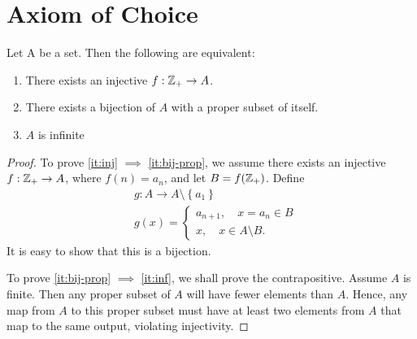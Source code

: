 \section{Axiom of Choice}
\begin{theorem}
	Let A be a set. Then the following are equivalent:
	\begin{enumerate}
		\item\label{it:inj} There exists an injective $f: \mathbb{Z}_{+} \to A$.
		\item\label{it:bij-prop} There exists a bijection of $A$ with a proper subset of itself.
		\item\label{it:inf} $A$ is infinite
	\end{enumerate}
\label{thm:inj-mapping}
\end{theorem}
\begin{proof}
	To prove \cref{it:inj} $\implies$ \cref{it:bij-prop}, we assume there exists an injective $f: \mathbb{Z}_{+} \to A$, where $f(n) =
	a_{n}$, and let $B = f(\mathbb{Z}_{+})$. Define
	\begin{equation*}
		\begin{split}
			& g: A \to A \setminus \left\{ a_{1} \right\} \\
			& g(x) = \begin{cases}
				a_{n+1}, \quad x = a_{n} \in B \\
				x, \quad x \in A \setminus B.
			\end{cases}
		\end{split}
	\end{equation*} It is easy to show that this is a bijection.

	To prove \cref{it:bij-prop} $\implies$ \cref{it:inf}, we shall prove the
	contrapositive. Assume $A$ is finite. Then any proper subset of $A$ will have
	fewer elements than $A$. Hence, any map from $A$ to this proper subset must
	have at least two elements from $A$ that map to the same output, violating
	injectivity.


\end{proof}
